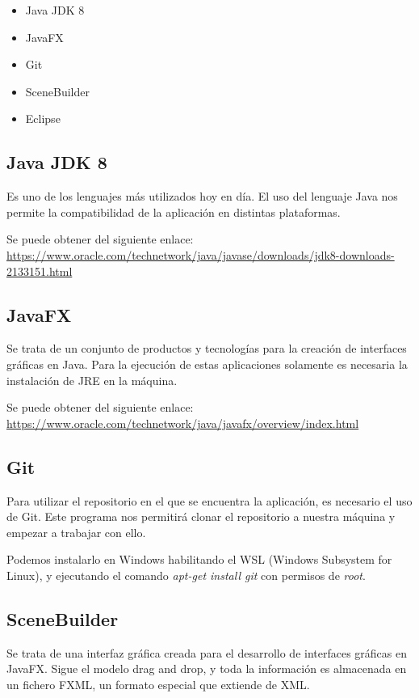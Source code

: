 \begin{itemize}
\item
Java JDK 8
\item
JavaFX
\item
Git
\item
SceneBuilder
\item
Eclipse
\end{itemize}

\subsection{Java JDK 8}

Es uno de los lenguajes más utilizados hoy en día. El uso del lenguaje Java nos permite la compatibilidad de la aplicación en distintas plataformas.

Se puede obtener del siguiente enlace: \url{https://www.oracle.com/technetwork/java/javase/downloads/jdk8-downloads-2133151.html}

\subsection{JavaFX}

Se trata de un conjunto de productos y tecnologías para la creación de interfaces gráficas en Java. Para la ejecución de estas aplicaciones solamente es necesaria la instalación de JRE en la máquina.

Se puede obtener del siguiente enlace:
\url{https://www.oracle.com/technetwork/java/javafx/overview/index.html}

\subsection{Git}

Para utilizar el repositorio en el que se encuentra la aplicación, es necesario el uso de Git. Este programa nos permitirá clonar el repositorio a nuestra máquina y empezar a trabajar con ello.

Podemos instalarlo en Windows habilitando el WSL (Windows Subsystem for Linux), y ejecutando el comando \emph{apt-get install git} con permisos de \emph{root}.


\subsection{SceneBuilder}

Se trata de una interfaz gráfica creada para el desarrollo de interfaces gráficas en JavaFX. Sigue el modelo drag and drop, y toda la información es almacenada en un fichero FXML, un formato especial que extiende de XML.


